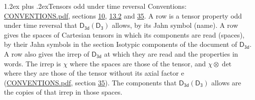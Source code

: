 \documentclass[10pt,a4paper]{article}
\makeatletter
\renewcommand\section{\@startsection{section}{1}{\z@}{-3ex plus -1ex minus -.2ex}%
  {1.2ex plus .2ex}{\normalfont\large\sffamily\bfseries\color{parttitle}}}
\numberwithin{equation}{section}
\newcommand{\grp}[1]{\mathsf{#1}}
\newcommand{\irrprod}{\otimes}
\makeatother
\begin{document}
\section{Tensors odd under time reversal}\label{s:time_odd}
Conventions: \href{../../CONVENTIONS.pdf}{CONVENTIONS.pdf}, sections \href{../../../rotation/CONVENTIONS.pdf\#conv.10}{10}, \href{../../../rotation/CONVENTIONS.pdf\#conv.13.2}{13.2} and \href{../../CONVENTIONS.pdf\#conv.35}{35}.
\leavevmode\label{n:head.name.property}A row is a tensor property odd under time reversal that $\grp{D_{3d}}(\grp{D_{3}})$ allows, by its Jahn symbol (name). \label{n:head.spaces}A row gives the spaces of Cartesian tensors in which its components are read (spaces), by their Jahn symbols in the section Isotypic components of the document of \href{../../../rotation/data/pdf/D3d.pdf}{$\grp{D_{3d}}$}. \label{n:head.properties}A row also gives the irrep of $\grp{D_{3d}}$ at which they are read and the properties in words. The irrep is $\chi$ where the spaces are those of the tensor, and $\chi \irrprod \det$ where they are those of the tensor without its axial factor e (\href{../../CONVENTIONS.pdf}{CONVENTIONS.pdf}, section \href{../../CONVENTIONS.pdf\#conv.35}{35}). The components that $\grp{D_{3d}}(\grp{D_{3}})$ allows are the copies of that irrep in those spaces.
\end{document}
